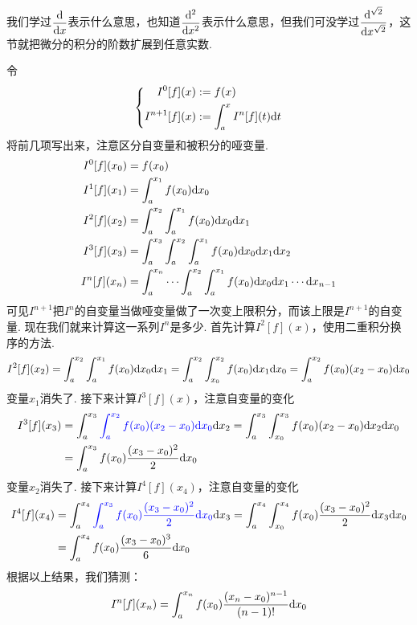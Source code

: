 \documentclass[main.tex]{subfiles}
\begin{document}
我们学过\(\displaystyle{\frac{{\rm d}}{{\rm d}x}}\)表示什么意思，也知道\(\displaystyle{\frac{{\rm d^2}}{{\rm d}x^2}}\)表示什么意思，但我们可没学过\(\displaystyle{\frac{{\rm d^{\sqrt{2}}}}{{\rm d}x^{\sqrt{2}}}}\)，这节就把微分的积分的阶数扩展到任意实数.

令
\[
    \left\{
        \begin{aligned} 
            I^0[f](x) &:= f(x) \\ 
            I^{n+1}[f](x) &:= \int_a^x I^n[f](t) {\rm d}t
        \end{aligned}
    \right.
\]
将前几项写出来，注意区分自变量和被积分的哑变量.
\begin{align*}
    I^0[f](x_0) &= f(x_0) \\
    I^1[f](x_1) &= \int_{a}^{x_1}f(x_0){\rm d}x_0 \\
    I^2[f](x_2) &= \int_{a}^{x_2}\int_{a}^{x_1}f(x_0){\rm d}x_0{\rm d}x_1 \\
    I^3[f](x_3) &= \int_{a}^{x_3}\int_{a}^{x_2}\int_{a}^{x_1}f(x_0){\rm d}x_0{\rm d}x_1{\rm d}x_2 \\
    I^n[f](x_n) &= \int_{a}^{x_n} \cdots \int_{a}^{x_2}\int_{a}^{x_1}f(x_0){\rm d}x_0 {\rm d}x_1 \cdots {\rm d}x_{n-1} 
\end{align*}
可见\(I^{n+1}\)把\(I^n\)的自变量当做哑变量做了一次变上限积分，而该上限是\(I^{n+1}\)的自变量. 现在我们就来计算这一系列\(I^n\)是多少. 首先计算\(I^2[f](x)\)，使用二重积分换序的方法.
\[I^2[f](x_2) = \int_{a}^{x_2}\int_{a}^{x_1}f(x_0){\rm d}x_0{\rm d}x_1 = \int_{a}^{x_2}\int_{x_0}^{x_2}f(x_0){\rm d}x_1{\rm d}x_0 = \int_{a}^{x_2}f(x_0)(x_2-x_0){\rm d}x_0\]
变量\(x_1\)消失了. 接下来计算\(I^3[f](x)\)，注意自变量的变化
\begin{align*}
    I^3[f](x_3) &= \int_{a}^{x_3} {\color{blue} \int_{a}^{x_2}f(x_0)(x_2-x_0){\rm d}x_0}{\rm d}x_2 
    = \int_{a}^{x_3} \int_{x_0}^{x_3} f(x_0)(x_2-x_0){\rm d}x_2 {\rm d}x_0 \\
    &= \int_{a}^{x_3} f(x_0)\frac{(x_3-x_0)^2}{2}{\rm d}x_0
\end{align*}
变量\(x_2\)消失了. 接下来计算\(I^4[f](x_4)\)，注意自变量的变化
\begin{align*}
    I^4[f](x_4) &= \int_{a}^{x_4} {\color{blue} \int_{a}^{x_3}f(x_0)\frac{(x_3-x_0)^2}{2}{\rm d}x_0}{\rm d}x_3
    = \int_{a}^{x_4} \int_{x_0}^{x_4} f(x_0)\frac{(x_3-x_0)^2}{2}{\rm d}x_3 {\rm d}x_0 \\
    &= \int_{a}^{x_4} f(x_0)\frac{(x_3-x_0)^3}{6}{\rm d}x_0
\end{align*}
根据以上结果，我们猜测：
\[I^n[f](x_n) = \int_{a}^{x_n} f(x_0)\frac{(x_n-x_0)^{n-1}}{(n-1)!}{\rm d}x_0\]
\end{document}
